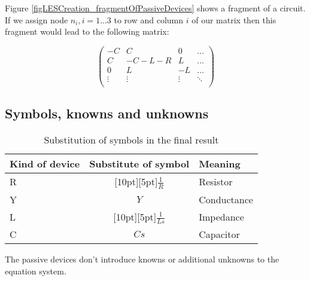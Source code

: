 Figure \ref{figLESCreation_fragmentOfPassiveDevices} shows a fragment of
a circuit. If we assign node $n_i, i=1 \ldots 3$ to row and column $i$ of
our matrix then this fragment would lead to the following matrix:

\begin{displaymath}
\label{eqLESCreation_fragmentOfPassiveDevices}
\left(
\begin{array}{cccc}
-C      & C      &  0     & \ldots \\
 C      & -C-L-R &  L     & \ldots \\
 0      &    L   & -L     & \ldots \\
 \vdots & \vdots & \vdots & \ddots \\
\end{array}
\right)
\end{displaymath}


\subsection{Symbols, knowns and unknowns}

\begin{table}[bt]
\begin{center}
\begin{tabular}{|l|c|p{2cm}|}

\hline

Kind of device & Substitute of symbol & Meaning \\
\hline

\hline

R & \raisebox{0pt}[10pt][5pt]{$\frac{1}{R}$}  & Resistor    \\
Y & $Y$                                       & Conductance \\
L & \raisebox{0pt}[10pt][5pt]{$\frac{1}{Ls}$} & Impedance   \\
C & $Cs$                                      & Capacitor   \\

 \hline
\end{tabular}
\caption{Substitution of symbols in the final result}
\label{tabSubstOfSymbols}
\end{center}
\end{table}

The passive devices don't introduce knowns or additional unknowns to the
equation system.

